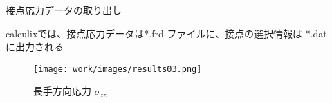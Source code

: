 \begin{frame}{接点応力データの取り出し}
 
  calculixでは、接点応力データは*.frd ファイルに、接点の選択情報は *.dat \\
  に出力される

\begin{figure}[htbp]
\centering
  \begin{minipage}{0.49\columnwidth}
     \centering
     \texttt{[image: work/images/results03.png]}
     \caption{長手方向応力
       \begin{math}
         σ_{zz}
       \end{math}
     }
  \end{minipage}
%
  \begin{minipage}{0.49\columnwidth}
  \end{minipage}
\end{figure}
\end{frame}
